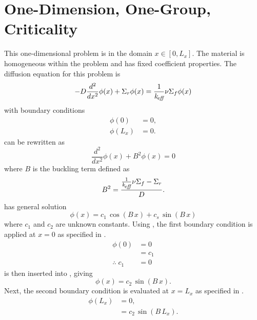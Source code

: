 \section{One-Dimension, One-Group, Criticality} 
  \label{sec:deriv_1d1g}
  This one-dimensional problem is in the domain $x \in [0,L_x]$. The material
  is homogeneous within the problem and has fixed coefficient properties. The
  diffusion equation for this problem is
  \begin{equation}
    \label{eq:1d1g}
    -D \frac{d^2}{dx^2} \phi(x) + \Sigma_r \phi(x) = 
      \frac{1}{k_{\!\mbox{\scriptsize \em eff}}} \nu \Sigma_f \phi(x)
  \end{equation}
  with boundary conditions
  \begin{align}
    \label{eq:1d1g_bc1}
    \phi(0) &= 0 ,\\
    \label{eq:1d1g_bc2}
    \phi(L_x) &= 0.
  \end{align}
   can be rewritten as
  \begin{equation}
    \label{eq:1d1g_buckle}
    \frac{d^2}{dx^2} \phi(x) + B^2 \phi(x) = 0
  \end{equation}
  where $B$ is the buckling term defined as
  \begin{equation}
    \label{eq:1d1g_b2}
    B^2 = \frac{\frac{1}{k_{\!\mbox{\scriptsize \em eff}}} \nu \Sigma_f - \Sigma_r}{D}.
  \end{equation}
   has general solution 
  \begin{equation}
    \label{eq:1d1g_general}
    \phi(x) = c_1 \, \cos(B \, x) + c_s \, \sin(B \, x)
  \end{equation}
  where $c_1$ and $c_2$ are unknown constants.
  Using , the first boundary condition is applied at $x=0$
  as specified in .
  \begin{align}
    \phi(0) &= 0 \\
    &= c_1 \\
    \label{eq:1d1g_c1}
    \therefore \; c_1 &= 0
  \end{align}
   is then inserted into , giving
  \begin{equation}
    \label{eq:1d1g_sin}
    \phi(x) = c_2 \, \sin(B \, x).
  \end{equation}
  Next, the second boundary condition is evaluated at $x=L_x$ as specified in
  .
  \begin{align}
    \phi(L_x) &= 0 ,\\
    &= c_2 \, \sin(B \, L_x).
  \end{align}
